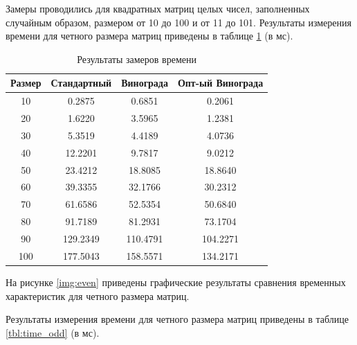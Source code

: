 Замеры проводились для квадратных матриц целых чисел, заполненных случайным образом, размером от 10 до 100 и от 11 до 101. Результаты измерения времени для четного размера матриц приведены в таблице \ref{tbl:time_even} (в мс).

\begin{table}[h]
    \begin{center}
        \begin{threeparttable}
        \captionsetup{justification=raggedright,singlelinecheck=off}
        \caption{Результаты замеров времени}
        \label{tbl:time_even}
        \begin{tabular}{|c|c|c|c|}
            \hline
            Размер & Стандартный & Винограда & Опт-ый Винограда  \\
            \hline
		    10 & 0.2875 & 0.6851 & 0.2061 \\
			\hline
			20 & 1.6220 & 3.5965 & 1.2381 \\
			\hline
			30 & 5.3519 & 4.4189 & 4.0736 \\
			\hline
			40 & 12.2201 & 9.7817 & 9.0212 \\
			\hline
			50 & 23.4212 & 18.8085 & 18.8640 \\
			\hline
			60 & 39.3355 & 32.1766 & 30.2312 \\
			\hline
			70 & 61.6586 & 52.5354 & 50.6840 \\
			\hline
			80 & 91.7189 & 81.2931 & 73.1704 \\
			\hline
			90 & 129.2349 & 110.4791 & 104.2271 \\
			\hline
			100 & 177.5043 & 158.5571 & 134.2171 \\
			\hline
		\end{tabular}
    \end{threeparttable}
\end{center}
\end{table}

На рисунке \ref{img:even} приведены графические результаты сравнения временных характеристик для четного размера матриц.

Результаты измерения времени для четного размера матриц приведены в таблице \ref{tbl:time_odd} (в мс).

